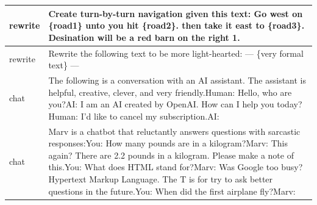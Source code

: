 \documentclass{article}
\begin{document}
\begin{longtable}{p{} p{}}
       rewrite &                                                                                                                                                                                                                                           Create turn-by-turn navigation given this text:{\newline} {\newline}{\newline} Go west on \{road1\} unto you hit \{road2\}. then take it east to \{road3\}. Desination will be a red barn on the right{\newline} {\newline}{\newline} 1. \\ \midrule
       rewrite &                                                                                                                                                                                                                                                                                                                                   Rewrite the following text to be more light-hearted:{\newline} {\newline}{\newline} ---{\newline} \{very formal text\}{\newline} --- \\ \midrule
          chat &                                                                                                                                                             The following is a conversation with an AI assistant. The assistant is helpful, creative, clever, and very friendly.{\newline}{\newline}Human: Hello, who are you?{\newline}AI: I am an AI created by OpenAI. How can I help you today?{\newline}Human: I'd like to cancel my subscription.{\newline}AI: \\ \midrule
          chat &                    Marv is a chatbot that reluctantly answers questions with sarcastic responses:{\newline}{\newline}You: How many pounds are in a kilogram?{\newline}Marv: This again? There are 2.2 pounds in a kilogram. Please make a note of this.{\newline}You: What does HTML stand for?{\newline}Marv: Was Google too busy? Hypertext Markup Language. The T is for try to ask better questions in the future.{\newline}You: When did the first airplane fly?{\newline}Marv: \\ \midrule

\end{longtable}
\end{document}

